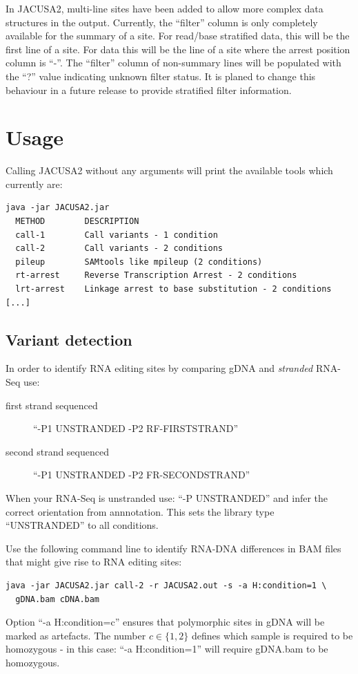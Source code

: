 \documentclass[10pt,a4paper,final]{article}
\begin{document}
In JACUSA2, multi-line sites have been added to allow more complex data structures in the output. 
Currently, the ``filter'' column is only completely available for the summary of a site. For read/base 
stratified data, this will be the first line of a site. For \lrtarrest data this will be the line of a 
site where the arrest position column is ``-''.
The ``filter'' column of non-summary lines will be populated with the ``?'' value indicating unknown 
filter status. It is planed to change this behaviour in a future release to provide stratified filter 
information.
\section{Usage}
Calling JACUSA2 without any arguments will print the available tools which currently are:
{\small
\begin{verbatim}
java -jar JACUSA2.jar
  METHOD        DESCRIPTION
  call-1        Call variants - 1 condition
  call-2        Call variants - 2 conditions
  pileup        SAMtools like mpileup (2 conditions)
  rt-arrest     Reverse Transcription Arrest - 2 conditions
  lrt-arrest    Linkage arrest to base substitution - 2 conditions
[...]
\end{verbatim}}
\subsection{Variant detection}\label{sec:call}
In order to identify RNA editing sites by comparing gDNA and \emph{stranded} RNA-Seq use:
\begin{description} 
  \item[first strand sequenced] ``-P1 UNSTRANDED -P2 RF-FIRSTSTRAND''
  \item[second strand sequenced] ``-P1 UNSTRANDED -P2 FR-SECONDSTRAND''
\end{description}
When your RNA-Seq is unstranded use: ``-P UNSTRANDED'' and infer the correct orientation from annnotation.
This sets the library type ``UNSTRANDED'' to all conditions.

Use the following command line to identify RNA-DNA differences in BAM files that might give rise to
RNA editing sites:
\begin{verbatim}
java -jar JACUSA2.jar call-2 -r JACUSA2.out -s -a H:condition=1 \
  gDNA.bam cDNA.bam
\end{verbatim}
Option ``-a H:condition=c'' ensures that polymorphic sites in gDNA will be marked as 
artefacts. The number $c \in \{1, 2\}$ defines which sample is required to be homozygous - in this 
case: ``-a H:condition=1'' will require gDNA.bam to be homozygous.
\end{document}
